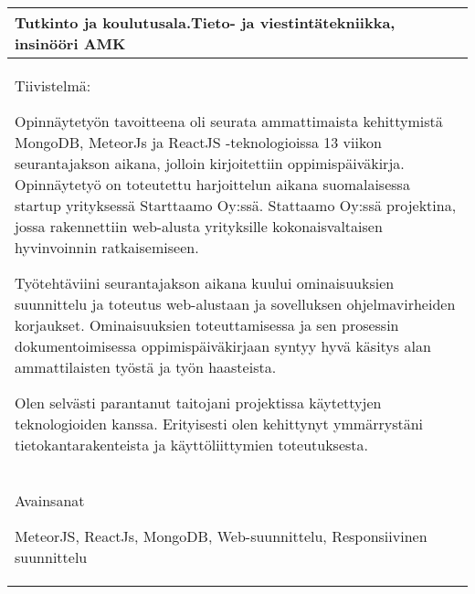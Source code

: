 \begin{tabular}{ | l | }
    \begin{minipage}[t][1.5cm][t]{10cm}
    Tutkinto ja koulutusala.\newline  Tieto- ja viestintätekniikka, insinööri AMK  

    \end{minipage}\\ \hline

    \begin{minipage}[t][7.5cm][t]{14.5cm}
    Tiivistelmä: \medskip 
    
    Opinnäytetyön tavoitteena oli seurata ammattimaista kehittymistä MongoDB, MeteorJs ja ReactJS -teknologioissa 13 viikon seurantajakson aikana, 
        jolloin kirjoitettiin oppimispäiväkirja. 
        Opinnäytetyö on toteutettu harjoittelun aikana 
        suomalaisessa startup yrityksessä Starttaamo Oy:ssä. 
        Stattaamo Oy:ssä projektina, jossa rakennettiin web-alusta
        yrityksille kokonaisvaltaisen hyvinvoinnin ratkaisemiseen.
        \medskip

    Työtehtäviini seurantajakson aikana kuului 
        ominaisuuksien suunnittelu ja toteutus web-alustaan ja sovelluksen ohjelmavirheiden korjaukset.
        Ominaisuuksien toteuttamisessa ja sen prosessin dokumentoimisessa oppimispäiväkirjaan syntyy hyvä käsitys alan ammattilaisten työstä ja työn haasteista. 
        \medskip

    Olen selvästi parantanut taitojani projektissa käytettyjen teknologioiden kanssa. 
    Erityisesti olen kehittynyt ymmärrystäni tietokantarakenteista ja käyttöliittymien toteutuksesta.
    \medskip


    \end{minipage}\\ \hline

    \begin{minipage}[t][2cm][t]{14cm}
    Avainsanat \medskip

    MeteorJS, ReactJs, MongoDB, Web-suunnittelu, Responsiivinen suunnittelu
    \end{minipage}\\ \hline

\end{tabular}


\newpage


